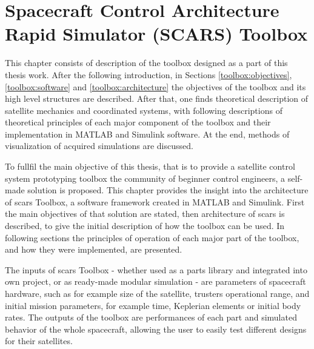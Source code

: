 \section{Spacecraft Control Architecture Rapid Simulator (SCARS) Toolbox}\label{sec:toolbox}
    This chapter consists of description of the toolbox designed as a part of this thesis work. After the following introduction, in Sections \ref{toolbox:objectives}, \ref{toolbox:software} and \ref{toolbox:architecture} the objectives of the toolbox and its high level structures are described. After that, one finds theoretical description of satellite mechanics and coordinated systems, with following descriptions of theoretical principles of each major component of the toolbox and their implementation in MATLAB and Simulink software. At the end, methods of visualization of acquired simulations are discussed.  

    To fullfil the main objective of this thesis, that is to provide a satellite control system prototyping toolbox the community of beginner control engineers, a self-made solution is proposed. This chapter provides the insight into the architecture of \ac*{scars} Toolbox, a software framework created in MATLAB and Simulink. First the main objectives of that solution are stated, then architecture of \ac{scars} is described, to give the initial description of how the toolbox can be used. In following sections the principles of operation of each major part of the toolbox, and how they were implemented, are presented.

    The inputs of \ac{scars} Toolbox - whether used as a parts library and integrated into own project, or as ready-made modular simulation - are parameters of spacecraft hardware, such as for example size of the satellite, trusters operational range, and initial mission parameters, for example time, Keplerian elements or initial body rates. The outputs of the toolbox are performances of each part and simulated behavior of the whole spacecraft, allowing the user to easily test different designs for their satellites.

